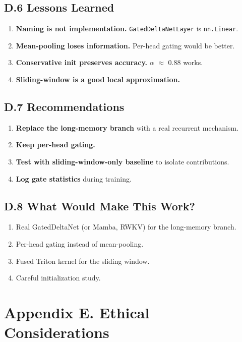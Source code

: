 \subsection{D.6 Lessons Learned}

\begin{enumerate}
\item \textbf{Naming is not implementation.} \texttt{GatedDeltaNetLayer} is \texttt{nn.Linear}.
\item \textbf{Mean-pooling loses information.} Per-head gating would be better.
\item \textbf{Conservative init preserves accuracy.} $\alpha$ $\approx$ 0.88 works.
\item \textbf{Sliding-window is a good local approximation.}

\end{enumerate}
\subsection{D.7 Recommendations}

\begin{enumerate}
\item \textbf{Replace the long-memory branch} with a real recurrent mechanism.
\item \textbf{Keep per-head gating.}
\item \textbf{Test with sliding-window-only baseline} to isolate contributions.
\item \textbf{Log gate statistics} during training.

\end{enumerate}
\subsection{D.8 What Would Make This Work?}

\begin{enumerate}
\item Real GatedDeltaNet (or Mamba, RWKV) for the long-memory branch.
\item Per-head gating instead of mean-pooling.
\item Fused Triton kernel for the sliding window.
\item Careful initialization study.

\end{enumerate}



\section{Appendix E. Ethical Considerations}

